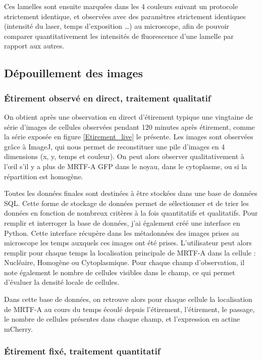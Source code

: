 	Ces lamelles sont ensuite marquées dans les 4 couleurs suivant un protocole strictement identique, et observées avec des paramètres strictement identiques (intensité du laser, temps d'exposition \dots) au microscope, afin de pouvoir comparer quantitativement les intensités de fluorescence d'une lamelle par rapport aux autres. 
	

	\subsection{Dépouillement des images}
	\subsubsection{\'Etirement observé en direct, traitement qualitatif}
	On obtient après une observation en direct d'étirement typique une vingtaine de série d'images de cellules observées pendant 120 minutes après étirement, comme la série exposée en figure \ref{Etirement_live} le présente.
	Les images sont observées grâce à ImageJ, qui nous permet de reconstituer une pile d'images en 4 dimensions (x, y, temps et couleur). On peut alors observer qualitativement à l'\oe il s'il y a plus de MRTF-A GFP dans le noyau, dans le cytoplasme, ou si la répartition est homogène. 
	
	Toutes les données finales sont destinées à être stockées dans une base de données SQL. Cette forme de stockage de données permet de sélectionner et de trier les données en fonction de nombreux critères à la fois quantitatifs et qualitatifs. Pour remplir et interroger la base de données, j'ai également créé une interface en Python. Cette interface récupère dans les métadonnées des images prises au microscope les temps auxquels ces images ont été prises. L'utilisateur peut alors remplir pour chaque temps la localisation principale de MRTF-A dans la cellule : Nucléaire, Homogène ou Cytoplasmique. 
	Pour chaque champ d'observation, il note également le nombre de cellules visibles dans le champ, ce qui permet d'évaluer la densité locale de cellules. 
	
	Dans cette base de données, on retrouve alors pour chaque cellule la localisation de MRTF-A au cours du temps écoulé depuis l'étirement, l'étirement, le passage, le nombre de cellules présentes dans chaque champ, et l'expression en actine mCherry.
	\subsubsection{\'Etirement fixé, traitement quantitatif}	
	
